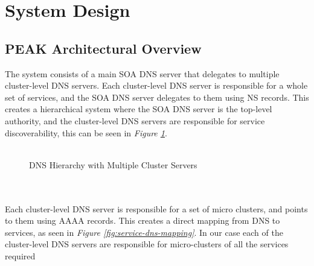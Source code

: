 \documentclass[12pt]{article}
\begin{document}
\section{System Design}
\subsection{PEAK Architectural Overview}
The system consists of a main SOA DNS server that delegates to multiple cluster-level DNS servers.
Each cluster-level DNS server is responsible for a whole set of services, and the SOA DNS server delegates to them using NS records.
This creates a hierarchical system where the SOA DNS server is the top-level authority, and the cluster-level DNS servers are responsible
for service discoverability,
this can be seen in \textit{Figure \ref{fig:dns-hierarchy}}.
\\
\\
\begin{figure}[h]
    \centering
    \caption{DNS Hierarchy with Multiple Cluster Servers}
    \label{fig:dns-hierarchy}
\end{figure}
\\
\\
Each cluster-level DNS server is responsible for a set of micro clusters, and points to them using AAAA records.
This creates a direct mapping from DNS to services, as seen in \textit{Figure \ref{fig:service-dns-mapping}}.
In our case each of the cluster-level DNS servers are responsible for micro-clusters of all the services required 
\end{document}
